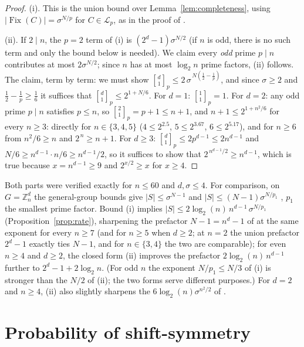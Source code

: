 \documentclass[11pt,a4paper]{article}
\theoremstyle{remark}
\DeclareMathOperator{\Fix}{Fix}
\newcommand{\ZZ}{\mathbb{Z}}
\newcommand{\gaussbinom}[2]{\genfrac{[}{]}{0pt}{}{#1}{#2}}
\begin{document}
\begin{proof}
(i). This is the union bound over Lemma~\ref{lem:completeness}, using
$|\Fix(C)|=\sigma^{N/p}$ for $C\in\mathcal L_p$, as in the proof of
\cite[Thm.~5(ii)]{cg2017}.

\noindent
(ii). If $2\mid n$, the $p=2$ term of (i) is
$(2^d-1)\sigma^{N/2}$ (if $n$ is odd, there is no such term and only
the bound below is needed). We claim every \emph{odd} prime $p\mid n$
contributes at most $2\sigma^{N/2}$; since $n$ has at most $\log_2 n$
prime factors, (ii) follows. The claim, term by term: we must show
$\gaussbinom d1_p\le 2\,\sigma^{\,N(\frac12-\frac1p)}$, and since
$\sigma\ge2$ and $\tfrac12-\tfrac1p\ge\tfrac16$ it suffices that
$\gaussbinom d1_p\le 2^{1+N/6}$.
For $d=1$: $\gaussbinom 11_p=1$. For $d=2$: any odd prime $p\mid n$
satisfies $p\le n$, so $\gaussbinom 21_p=p+1\le n+1$, and
$n+1\le2^{1+n^2/6}$ for every $n\ge3$: directly for $n\in\{3,4,5\}$
($4\le2^{2.5}$, $5\le2^{3.67}$, $6\le2^{5.17}$), and for $n\ge6$ from
$n^2/6\ge n$ and $2^{\,n}\ge n+1$. For $d\ge3$:
$\gaussbinom d1_p\le 2p^{d-1}\le 2n^{d-1}$ and
$N/6\ge n^{d-1}\cdot n/6\ge n^{d-1}/2$, so it suffices to show that
$2^{\,n^{d-1}/2}\ge n^{d-1}$, which is true because $x=n^{d-1}\ge9$ and
$2^{x/2}\ge x$ for $x\ge4$.
\end{proof}

Both parts were verified exactly for $n\le60$ and $d, \sigma\le4$.
For comparison, on $G=\ZZ_n^d$ the general-group bounds give
$|S|\le\sigma^{N-1}$ \cite[Cor.~1.7.2]{gjs2016} and
$|S|\le(N-1)\sigma^{N/p_1}$ \cite[Thm.~5(ii)]{cg2017}, $p_1$ the smallest
prime factor. Bound (i) implies
$|S|\le2\log_2(n)\,n^{d-1}\,\sigma^{N/p_1}$
(Proposition~\ref{prop:rate}), sharpening the prefactor $N-1=n^d-1$ of
\cite{cg2017} at the same exponent for every $n\ge7$ (and for $n\ge5$ when
$d\ge2$; at $n=2$ the union prefactor
$2^d-1$ exactly
ties $N-1$, and for $n\in\{3,4\}$ the two are comparable); for even
$n\ge4$ and $d\ge2$, the closed form (ii) improves the prefactor $2\log_2(n)\,n^{d-1}$
further to $2^d-1+2\log_2 n$. (For odd $n$ the exponent $N/p_1\le N/3$ of (i) is
stronger than the $N/2$ of (ii); the two forms serve different purposes.)
For $d=2$ and $n\ge4$, (ii) also slightly sharpens the
$6\log_2(n)\sigma^{n^2/2}$ of \cite[Lemma~E.22]{banda2019}.

\section{Probability of shift-symmetry}\label{sec:probability}
\end{document}
